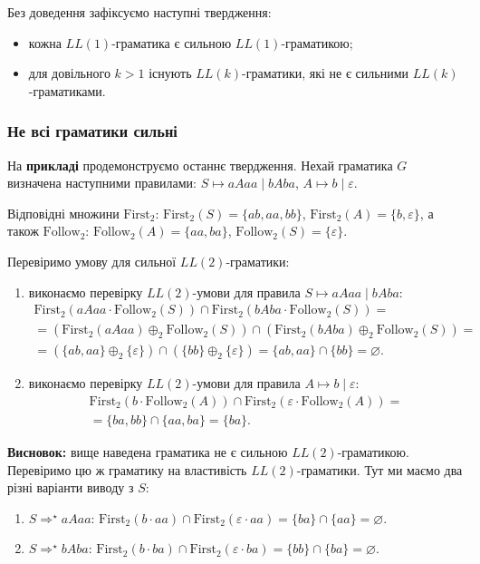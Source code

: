 Без доведення зафіксуємо наступні твердження:
\begin{itemize}
	\item кожна $LL(1)$-граматика є сильною $LL(1)$-граматикою;
	\item для довільного $k > 1$ існують $LL(k)$-граматики, які не є сильними $LL(k)$-гра\-ма\-ти\-ка\-ми.
\end{itemize}

\subsubsection{Не всі граматики сильні}

На \textbf{прикладі} продемонструємо останнє твердження. Нехай граматика $G$ визначена наступними правилами: $S \mapsto aAaa \mid bAba$, $A \mapsto b \mid \varepsilon$. \medskip

Відповідні множини $\text{First}_2$: $\text{First}_2(S) = \{ab, aa, bb\}$, $\text{First}_2(A) = \{b, \varepsilon\}$, а також $\text{Follow}_2$: $\text{Follow}_2(A) = \{aa, ba\}$, $\text{Follow}_2(S) = \{\varepsilon\}$. \medskip

Перевіримо умову для сильної $LL(2)$-граматики:
\begin{enumerate}
	\item  виконаємо перевірку $LL(2)$-умови для правила $S \mapsto aAaa \mid bAba$:
	\begin{multline}
		\text{First}_2(aAaa \cdot \text{Follow}_2(S)) \cap \text{First}_2(bAba \cdot \text{Follow}_2(S)) = \\
		= (\text{First}_2(aAaa) \oplus_2 \text{Follow}_2(S)) \cap (\text{First}_2(bAba) \oplus_2 \text{Follow}_2(S)) = \\
		= (\{ab, aa\} \oplus_2 \{\varepsilon\}) \cap (\{bb\} \oplus_2 \{\varepsilon\}) = \{ab,aa\}\cap \{bb\} = \varnothing.
	\end{multline}
	\item виконаємо перевірку $LL(2)$-умови для правила $A \mapsto b \mid \varepsilon$:
	\begin{multline}
		\text{First}_2(b \cdot \text{Follow}_2(A)) \cap \text{First}_2(\varepsilon \cdot \text{Follow}_2(A)) = \\
		= \{ba,bb\}\cap\{aa,ba\}=\{ba\}.
	\end{multline}
\end{enumerate}

\textbf{Висновок:} вище наведена граматика не є сильною $LL(2)$-гра\-ма\-ти\-ко\-ю. Перевіримо цю ж граматику на властивість $LL(2)$-граматики. Тут ми маємо два різні варіанти виводу з $S$:
\begin{enumerate}
	\item $S \Rightarrow^\star aAaa$: $\text{First}_2(b \cdot aa) \cap \text{First}_2(\varepsilon \cdot aa) = \{ba\} \cap \{aa\} = \varnothing$.
	\item $S \Rightarrow^\star bAba$: $\text{First}_2(b \cdot ba) \cap \text{First}_2(\varepsilon \cdot ba) = \{bb\} \cap \{ba\} = \varnothing$.
\end{enumerate}

